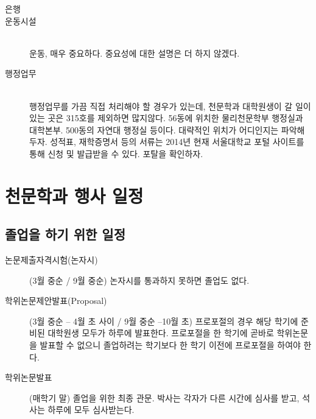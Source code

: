 \begin{description}
\item[\textsf{은행}] \hfill
\item[\textsf{운동시설}] \hfill \\
  운동, 매우 중요하다. 중요성에 대한 설명은 더 하지 않겠다.

\item[\textsf{행정업무}] \hfill \\
  행정업무를 가끔 직접 처리해야 할 경우가 있는데, 천문학과 대학원생이 갈 일이
  있는 곳은 315호를 제외하면 많지않다. 56동에 위치한 물리천문학부 행정실과
  대학본부. 500동의 자연대 행정실 등이다. 대략적인 위치가 어디인지는 파악해두자.
  성적표, 재학증명서 등의 서류는 2014년 현재 서울대학교 포털 사이트를 통해 신청
  및 발급받을 수 있다. 포탈을 확인하자.
\end{description}

\section{천문학과 행사 일정}
\subsection{졸업을 하기 위한 일정}
\begin{description}
\item[논문제출자격시험(논자시)] (3월 중순 / 9월 중순) 논자시를 통과하지 못하면
  졸업도 없다.
\item[학위논문제안발표(Proposal)] (3월 중순 -- 4월 초 사이 / 9월 중순 --10월 초)
  프로포절의 경우 해당 학기에 준비된 대학원생 모두가 하루에 발표한다.  프로포절을
  한 학기에 곧바로 학위논문을 발표할 수 없으니 졸업하려는 학기보다 한 학기 이전에
  프로포절을 하여야 한다.
\item[학위논문발표] (매학기 말) 졸업을 위한 최종 관문. 박사는 각자가 다른 시간에
  심사를 받고, 석사는 하루에 모두 심사받는다.
\end{description}

